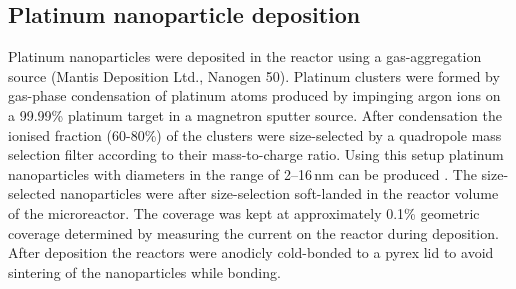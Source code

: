 \documentclass[8.5pt,twoside,twocolumn]{article}
\begin{document}
\subsection{Platinum nanoparticle deposition}
Platinum nanoparticles were deposited in the reactor using a gas-aggregation source (Mantis Deposition Ltd., Nanogen 50). Platinum clusters were formed by gas-phase condensation of platinum atoms produced by impinging argon ions on a 99.99\% platinum target in a magnetron sputter source. After condensation the ionised fraction (60-80\%) of the clusters were size-selected by a quadropole mass selection filter according to their mass-to-charge ratio. Using this setup platinum nanoparticles with diameters in the range of 2--16\,nm can be produced \cite{Nielsen2010,Nielsen2009}. The size-selected nanoparticles were after size-selection soft-landed in the reactor volume of the microreactor. The coverage was kept at approximately 0.1\% geometric coverage determined by measuring the current on the reactor during deposition. After deposition the reactors were anodicly cold-bonded \cite{Vesborg2010} to a pyrex lid to avoid sintering of the nanoparticles while bonding.
\end{document}
